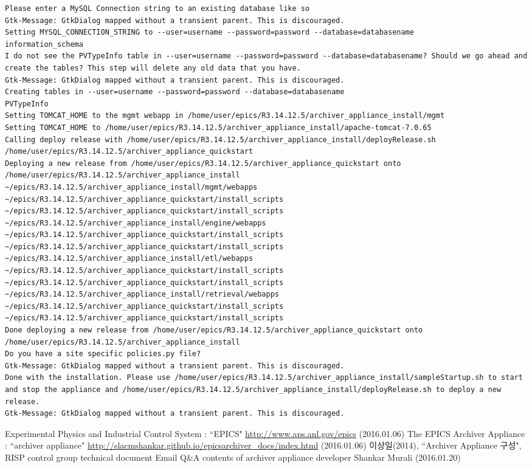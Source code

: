 \documentclass[11pt
  , a4paper
  , article
  , oneside
]{memoir}
\begin{document}
\begin{lstlisting}[style=termstyle]
Please enter a MySQL Connection string to an existing database like so
Gtk-Message: GtkDialog mapped without a transient parent. This is discouraged.
Setting MYSQL_CONNECTION_STRING to --user=username --password=password --database=databasename
information_schema
I do not see the PVTypeInfo table in --user=username --password=password --database=databasename? Should we go ahead and create the tables? This step will delete any old data that you have.
Gtk-Message: GtkDialog mapped without a transient parent. This is discouraged.
Creating tables in --user=username --password=password --database=databasename
PVTypeInfo
Setting TOMCAT_HOME to the mgmt webapp in /home/user/epics/R3.14.12.5/archiver_appliance_install/mgmt
Setting TOMCAT_HOME to /home/user/epics/R3.14.12.5/archiver_appliance_install/apache-tomcat-7.0.65
Calling deploy release with /home/user/epics/R3.14.12.5/archiver_appliance_install/deployRelease.sh /home/user/epics/R3.14.12.5/archiver_appliance_quickstart
Deploying a new release from /home/user/epics/R3.14.12.5/archiver_appliance_quickstart onto /home/user/epics/R3.14.12.5/archiver_appliance_install
~/epics/R3.14.12.5/archiver_appliance_install/mgmt/webapps ~/epics/R3.14.12.5/archiver_appliance_quickstart/install_scripts
~/epics/R3.14.12.5/archiver_appliance_quickstart/install_scripts
~/epics/R3.14.12.5/archiver_appliance_install/engine/webapps ~/epics/R3.14.12.5/archiver_appliance_quickstart/install_scripts
~/epics/R3.14.12.5/archiver_appliance_quickstart/install_scripts
~/epics/R3.14.12.5/archiver_appliance_install/etl/webapps ~/epics/R3.14.12.5/archiver_appliance_quickstart/install_scripts
~/epics/R3.14.12.5/archiver_appliance_quickstart/install_scripts
~/epics/R3.14.12.5/archiver_appliance_install/retrieval/webapps ~/epics/R3.14.12.5/archiver_appliance_quickstart/install_scripts
~/epics/R3.14.12.5/archiver_appliance_quickstart/install_scripts
Done deploying a new release from /home/user/epics/R3.14.12.5/archiver_appliance_quickstart onto /home/user/epics/R3.14.12.5/archiver_appliance_install
Do you have a site specific policies.py file?
Gtk-Message: GtkDialog mapped without a transient parent. This is discouraged.
Done with the installation. Please use /home/user/epics/R3.14.12.5/archiver_appliance_install/sampleStartup.sh to start and stop the appliance and /home/user/epics/R3.14.12.5/archiver_appliance_install/deployRelease.sh to deploy a new release.
Gtk-Message: GtkDialog mapped without a transient parent. This is discouraged.
\end{lstlisting}
\clearpage

\begin{thebibliography}{widestlabel}
	 Experimental Physics and Industrial Control System : ``EPICS" 
	\url{http://www.aps.anl.gov/epics} (2016.01.06)
	 The EPICS Archiver Appliance : ``archiver appliance"
	\url{http://slacmshankar.github.io/epicsarchiver_docs/index.html} (2016.01.06)
	 이상일(2014), ``Archiver Appliance 구성", RISP control group technical document
	 Email Q\&A contents of archiver appliance developer Shankar Murali (2016.01.20)
\end{thebibliography}
\end{document}
